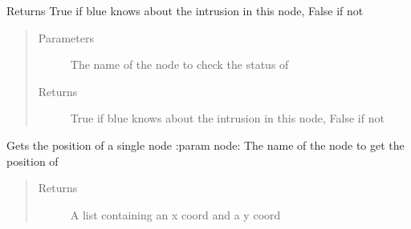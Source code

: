 \documentclass[letterpaper,10pt,english]{sphinxmanual}
\begin{document}
\begin{fulllineitems}
\begin{fulllineitems}
\end{fulllineitems}


\begin{fulllineitems}
\label{\detokenize{source/yawning_titan.envs.generic.core:yawning_titan.envs.generic.core.network_interface.NetworkInterface.get_single_node_known_intrusion_status}}
\sphinxAtStartPar
Returns True if blue knows about the intrusion in this node, False if not
\begin{quote}\begin{description}
\item[{Parameters}] \leavevmode
\sphinxAtStartPar
{} \textendash{} The name of the node to check the status of

\item[{Returns}] \leavevmode
\sphinxAtStartPar
True if blue knows about the intrusion in this node, False if not

\end{description}\end{quote}

\end{fulllineitems}


\begin{fulllineitems}
\label{\detokenize{source/yawning_titan.envs.generic.core:yawning_titan.envs.generic.core.network_interface.NetworkInterface.get_single_node_position}}
\sphinxAtStartPar
Gets the position of a single node
:param node: The name of the node to get the position of
\begin{quote}\begin{description}
\item[{Returns}] \leavevmode
\sphinxAtStartPar
A list containing an x coord and a y coord


\end{description}
\end{quote}
\end{fulllineitems}
\end{fulllineitems}
\end{document}
